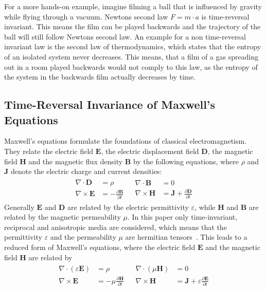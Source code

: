 For a more hands-on example, imagine filming a ball that is influenced by gravity while flying through a vacuum.
Newtons second law \({F}=m \cdot {a}\) is time-reversal invariant. This means the film can be played backwards and the trajectory of the ball will still follow Newtons second law.
An example for a non time-reversal invariant law is the second law of thermodynamics, which states that the entropy of an isolated system never decreases.
This means, that a film of a gas spreading out in a room played backwards would not comply to this law, as the entropy of the system in the backwards film actually decreases by time.



\subsection{Time-Reversal Invariance of Maxwell's Equations}
Maxwell's equations formulate the foundations of classical electromagnetism.
They relate the electric field \(\bm{E}\), the electric displacement field \(\bm{D}\), the magnetic field \(\bm{H}\) and the magnetic flux density \(\bm{B}\)  by the following equations, where \(\rho \) and \({\bm{J}}\) denote the electric charge and current densities:
\begin{align}
    \begin{split}
        \nabla \cdot \bm{D} &= \rho \\
        \nabla \times \bm{E} &= -\frac{\partial \bm{B}}{\partial t}
    \end{split}
    &
    \begin{split}
        \nabla \cdot \bm{B} &= 0 \\
        \nabla \times \bm{H} &= \bm{J} + \frac{\partial \bm{D}}{\partial t}
    \end{split}
\end{align}
Generally \(\bm{E}\) and \(\bm{D}\) are related by the electric permittivity \(\varepsilon \), while \(\bm{H}\) and \(\bm{B}\) are related by the magnetic permeability \(\mu \).
In this paper only time-invariant, reciprocal and anisotropic media are considered, which means that the permittivity \(\varepsilon \) and the permeability \(\mu \) are hermitian tensors~\parencite{krowne_electromagnetic_1984}.
This leads to a reduced form of Maxwell's equations, where the electric field \(\bm{E}\) and the magnetic field \(\bm{H}\) are related by
\begin{align}
    \begin{split}
        \nabla \cdot (\varepsilon \bm{E}) &= \rho \\
        \nabla \times \bm{E} &= -\mu \frac{\partial \bm{H}}{\partial t}
    \end{split}
    &
    \begin{split}
        \nabla \cdot (\mu \bm{H}) &= 0 \\
        \nabla \times \bm{H} &= \bm{J} + \varepsilon \frac{\partial \bm{E}}{\partial t}
    \end{split}
\end{align}

